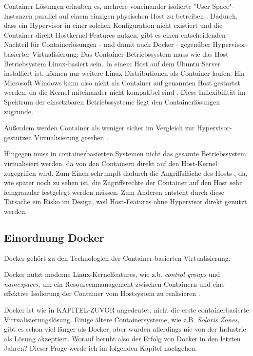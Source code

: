 \documentclass[../main.tex]{subfiles}
\begin{document}
      Container-Lösungen erlauben es, mehrere voneinander isolierte "User Space"-Instanzen parallel auf einem einzigen physischen Host zu betreiben \cite[S.6]{dockerBook}. Dadurch, dass ein Hypervisor in einer solchen Konfiguration nicht existiert und die Container direkt Hostkernel-Features nutzen, gibt es einen entscheidenden Nachteil für Containerlösungen - und damit auch Docker - gegenüber Hypervisor-basierter Virtualisierung: Das Container-Betriebssystem muss wie das Host-Betriebsystem Linux-basiert sein. In einem Host auf dem Ubuntu Server installiert ist, können nur weitere Linux-Distributionen als Container laufen. Ein Microsoft Windows kann also nicht als Container auf genannten Host gestartet werden, da die Kernel miteinander nicht kompatibel sind \cite[S.6]{dockerBook}. Diese Inflexibilität im Spektrum der einsetzbaren Betriebssysteme liegt den Containerlösungen zugrunde.

      Außerdem werden Container als weniger sicher im Vergleich zur Hypervisor-gestützen Virtualisierung gesehen \cite[S.6]{dockerBook}.

      Hingegen muss in containerbasierten Systemen nicht das gesamte Betriebssystem virtualisiert werden, da von den Containern direkt auf den Host-Kernel zugegriffen wird. Zum Einen schrumpft dadurch die Angriffsfläche des Hosts \cite[S.6]{dockerBook}, da, wie später noch zu sehen ist, die Zugriffsrechte der Container auf den Host sehr feingranular festgelegt werden müssen. Zum Anderen entsteht durch diese Tatsache ein Risko im Design, weil Host-Features ohne Hypervisor direkt genutzt werden.

	  \subsection{Einordnung Docker}
      Docker gehört zu den Technologien der Container-basierten Virtualisierung.

      Docker nutzt moderne Linux-Kernelfeatures, wie z.b. \emph{control groups} und \emph{namespaces}, um ein Resourcenmanagement zwischen Containern und eine effektive Isolierung der Container vom Hostsystem zu realisieren \cite[S.7]{dockerBook}.

      Docker ist wie in KAPITEL-ZUVOR angedeutet, nicht die erste containerbasierte Virtualisierungslösung. Einige ältere Containersysteme, wie z.B. \emph{Solaris Zones}, gibt es schon viel länger als Docker, aber wurden allerdings nie von der Industrie als Lösung akzeptiert. Worauf beruht also der Erfolg von Docker in den letzten Jahren? Dieser Frage werde ich im folgenden Kapitel nachgehen.
\end{document}
